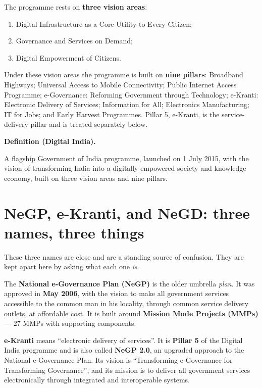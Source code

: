 \documentclass[11pt]{article}
\newenvironment{definitionbox}[1]{%
  \par\noindent\textbf{Definition (#1).}\ \itshape
}{\par\vspace{0.3em}}
\begin{document}
The programme rests on \textbf{three vision areas}:
\begin{enumerate}[label=(\roman*)]
  \item Digital Infrastructure as a Core Utility to Every Citizen;
  \item Governance and Services on Demand;
  \item Digital Empowerment of Citizens.
\end{enumerate}

Under these vision areas the programme is built on \textbf{nine pillars}:
Broadband Highways; Universal Access to Mobile Connectivity; Public Internet
Access Programme; e-Governance: Reforming Government through Technology;
e-Kranti: Electronic Delivery of Services; Information for All; Electronics
Manufacturing; IT for Jobs; and Early Harvest Programmes. Pillar 5,
e-Kranti, is the service-delivery pillar and is treated separately below.

\begin{definitionbox}{Digital India}
A flagship Government of India programme, launched on 1 July 2015, with the
vision of transforming India into a digitally empowered society and
knowledge economy, built on three vision areas and nine pillars.
\end{definitionbox}

\section{NeGP, e-Kranti, and NeGD: three names, three things}
These three names are close and are a standing source of confusion. They are
kept apart here by asking what each one \emph{is}.

The \textbf{National e-Governance Plan (NeGP)} is the older umbrella
\emph{plan}. It was approved in \textbf{May 2006}, with the vision to make
all government services accessible to the common man in his locality,
through common service delivery outlets, at affordable cost. It is built
around \textbf{Mission Mode Projects (MMPs)} --- 27 MMPs with supporting
components.

\textbf{e-Kranti} means ``electronic delivery of services''. It is
\textbf{Pillar 5} of the Digital India programme and is also called
\textbf{NeGP 2.0}, an upgraded approach to the National e-Governance Plan.
Its vision is ``Transforming e-Governance for Transforming Governance'',
and its mission is to deliver all government services electronically through
integrated and interoperable systems.
\end{document}
